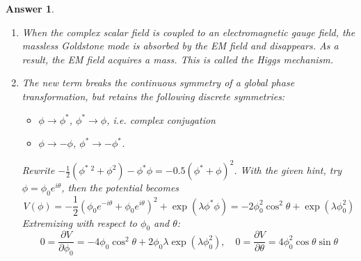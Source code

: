 \documentclass[a4paper]{article}
\newtheorem{ans}{Answer}[section]
\theoremstyle{new}
\begin{document}
\begin{ans}
\begin{enumerate}[label=(\alph*)]
\begin{align}
    V(\phi)&\rightarrow-\phi_0^2-\phi_0(\chi+\chi^*)-\chi^*\chi+e^{\lambda\phi_0^2}(1+\lambda\phi_0(\chi+\chi^*)+0.5\lambda^2\phi_0^2(\chi+\chi^*)^2)\nonumber\\&=\frac{\ln\lambda}{\lambda}-\phi_0(\chi+\chi^*)-\chi^*\chi+\frac{1}{\lambda}+\frac{\lambda}{2}\bigg(-\frac{\ln\lambda}{\lambda}\bigg)(\chi+\chi^*)^2\nonumber\\&=\frac{\ln\lambda+1}{\lambda}-\frac{\ln\lambda}{2}(\chi+\chi^*)^2\implies\mathcal{L}\rightarrow(\partial_\mu\chi^*)(\partial^\mu\chi)+\frac{\ln\lambda}{2}(\chi+\chi^*)^2\nonumber
\end{align}
unique up to an irrelevant constant. Upon spontaneously breaking a continuous symmetry, we find that the fluctuations of a complex scalar field about one of the infinitely many minima depend only on the real part of the fluctuating field $\chi^*+\chi$. Upon writing $\chi=\chi_1+i\chi_2$, we see that $V=2\ln\lambda~\chi_1^2+0~\chi_2^2$ and so the real scalar field $\chi_1$ is massive with mass $\sqrt{2\ln\lambda}$ ($\lambda<1\implies\ln\lambda<0$) but $\chi_2$ is massless, where the mass is the coefficient in the quadratic term. This follows from the dispersion relation $(\omega^2-k^2-2\ln\lambda)\chi_1+(\omega^2-k^2)\chi_2=0$. This massless excitation is typical of the breaking of a continuous symmetry and it is called a Goldstone mode.
\item When the complex scalar field is coupled to an electromagnetic gauge field, the massless Goldstone mode is absorbed by the EM field and disappears. As a result, the EM field acquires a mass. This is called the Higgs mechanism.
\item The new term breaks the continuous symmetry of a global phase transformation, but retains the following discrete symmetries:
\begin{itemize}
    \item $\phi\rightarrow\phi^*$, $\phi^*\rightarrow\phi$, i.e. complex conjugation
    \item $\phi\rightarrow-\phi$, $\phi^*\rightarrow-\phi^*$.
\end{itemize}
Rewrite $-\frac{1}{2}(\phi^*~^2+\phi^2)-\phi^*\phi=-0.5(\phi^*+\phi)^2$. With the given hint, try $\phi=\phi_0e^{i\theta}$, then the potential becomes
$$V(\phi)=-\frac{1}{2}(\phi_0e^{-i\theta}+\phi_0e^{i\theta})^2+\exp(\lambda\phi^*\phi)=-2\phi_0^2\cos^2\theta+\exp(\lambda\phi_0^2)$$
Extremizing with respect to $\phi_0$ and $\theta$:
$$0=\frac{\partial V}{\partial\phi_0}=-4\phi_0\cos^2\theta+2\phi_0\lambda\exp(\lambda\phi_0^2),\quad 0=\frac{\partial V}{\partial\theta}=4\phi_0^2\cos\theta\sin\theta$$

\end{enumerate}
\end{ans}
\end{document}
